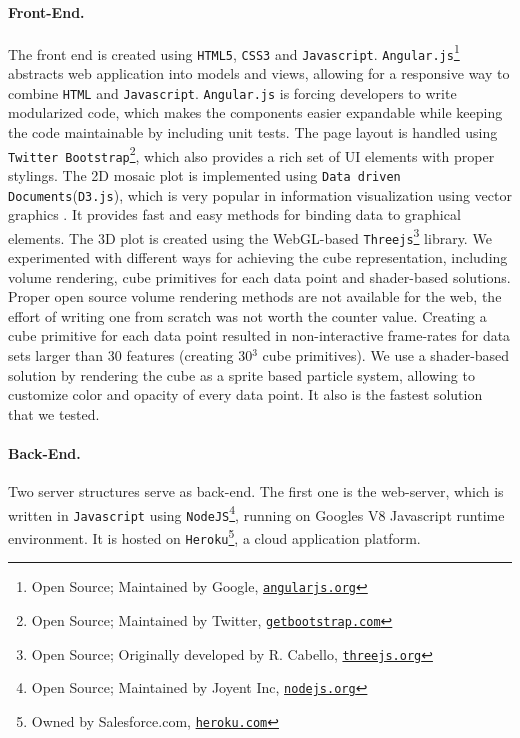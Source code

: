 \documentclass[journal]{style/vgtc} 			          %
\begin{document}
\paragraph{Front-End.}
The front end is created using \texttt{HTML5}, \texttt{CSS3} and \texttt{Javascript}.
\texttt{Angular.js}\footnote{Open Source; Maintained by Google, \href{https://www.angularjs.org/}{\texttt{angularjs.org}}} abstracts web application into models and views, allowing for a responsive way to combine \texttt{HTML} and \texttt{Javascript}.
\texttt{Angular.js} is forcing developers to write modularized code, which makes the components easier expandable while keeping the code maintainable by including unit tests.
The page layout is handled using \texttt{Twitter Bootstrap}\footnote{Open Source; Maintained by Twitter, \href{http://getbootstrap.com}{\texttt{getbootstrap.com}}}, which also provides a rich set of UI elements with proper stylings.
The 2D mosaic plot is implemented using \texttt{Data driven Documents}(\texttt{D3.js}), which is very popular in information visualization using vector graphics \cite{D3}.
It provides fast and easy methods for binding data to graphical elements.
The 3D plot is created using the WebGL-based \texttt{Threejs}\footnote{Open Source; Originally developed by R. Cabello, \href{http://threejs.org}{\texttt{threejs.org}}} library.
We experimented with different ways for achieving the cube representation, including volume rendering, cube primitives for each data point and shader-based solutions.
Proper open source volume rendering methods are not available for the web, the effort of writing one from scratch was not worth the counter value.
Creating a cube primitive for each data point resulted in non-interactive frame-rates for data sets larger than 30 features (creating 30$^3$ cube primitives).
We use a shader-based solution by rendering the cube as a sprite based particle system, allowing to customize color and opacity of every data point.
It also is the fastest solution that we tested.

\paragraph{Back-End.}
Two server structures serve as back-end.
The first one is the web-server, which is written in \texttt{Javascript} using \texttt{NodeJS}\footnote{Open Source; Maintained by Joyent Inc, \href{http://nodejs.org}{\texttt{nodejs.org}}}, running on Googles V8 Javascript runtime environment.
It is hosted on \texttt{Heroku}\footnote{Owned by Salesforce.com, \href{https://www.heroku.com/}{\texttt{heroku.com}}}, a cloud application platform.
\end{document}
